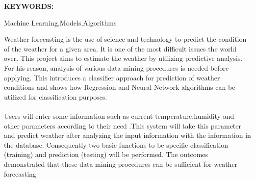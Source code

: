 
\abstract

\noindent \textbf{KEYWORDS:} \hspace*{0.5em} \parbox[t]{4.4in}{Machine Learning,Models,Algorithms}

\vspace*{24pt}

\noindent Weather forecasting is the use of science and technology to predict the condition of the weather for a given area. It is one of the most difficult issues the world over. This project aims to estimate the weather by utilizing predictive analysis. For his reason, analysis of various data mining procedures is needed before applying. This introduces a classifier approach for prediction of weather conditions and shows how Regression and Neural Network algorithms can be utilized for classification purposes.
\\
\\
\noindent Users will enter some information such as current temperature,humidity and other parameters according to their need .This system will take this parameter and predict weather after analyzing the input information with the information in the database. Consequently two basic functions to be specific classification (training) and prediction (testing) will be performed. The outcomes demonstrated that these data mining procedures can be sufficient for weather forecasting
\pagebreak